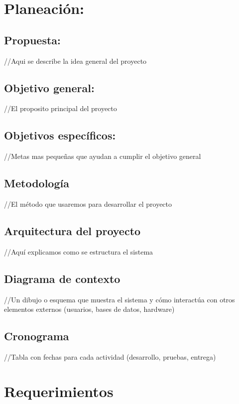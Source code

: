 \documentclass[12pt, letterpaper]{article}
\begin{document}
\section{\textbf{Planeación:}}
\subsection{Propuesta:}
//Aqui se describe la idea general del proyecto\\

\subsection{Objetivo general:}
//El proposito principal del proyecto\\

\subsection{Objetivos específicos:}
//Metas mas pequeñas que ayudan a cumplir el objetivo general\\

\subsection{Metodología}
//El método que usaremos para desarrollar el proyecto\\

\subsection{Arquitectura del proyecto}
//Aquí explicamos como se estructura el sistema\\

\subsection{Diagrama de contexto}
//Un dibujo o esquema que muestra el sistema y cómo interactúa con otros elementos externos (usuarios, bases de datos, hardware)\\

\subsection{Cronograma}
//Tabla con fechas para cada actividad (desarrollo, pruebas, entrega)\\

\section{\textbf{Requerimientos}}
\end{document}
